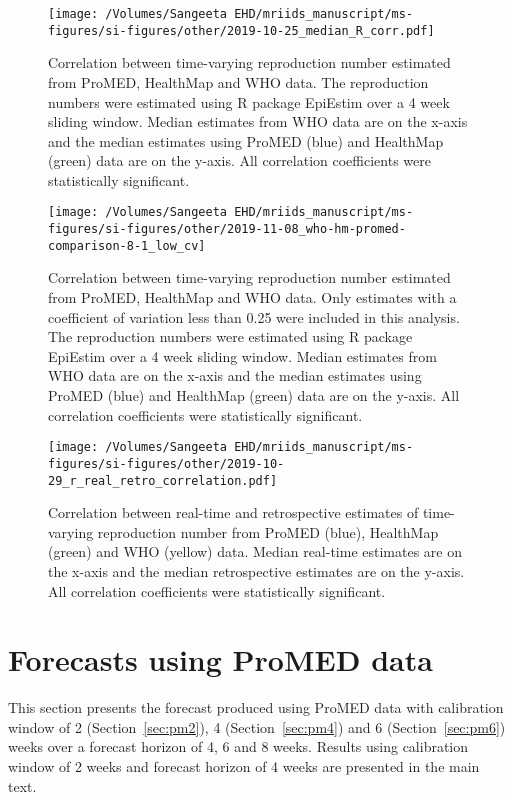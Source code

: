 \documentclass[9pt,twoside,lineno]{pnas-new}
\begin{document}
\begin{figure}
  \centering
  \texttt{[image: /Volumes/Sangeeta EHD/mriids\_manuscript/ms-figures/si-figures/other/2019-10-25\_median\_R\_corr.pdf]}
  \caption{Correlation between time-varying reproduction number estimated from
    ProMED, HealthMap and WHO data. The reproduction numbers were
    estimated using R package EpiEstim over a 4 week sliding
    window. Median estimates from WHO data are on the x-axis and the
    median estimates using ProMED (blue) and HealthMap (green) data
    are on the y-axis. All correlation coefficients were statistically
  significant.}
  \label{fig:rcorr}
\end{figure}\FloatBarrier

\begin{figure}
  \centering
  \texttt{[image: /Volumes/Sangeeta EHD/mriids\_manuscript/ms-figures/si-figures/other/2019-11-08\_who-hm-promed-comparison-8-1\_low\_cv]}
  \caption{Correlation between time-varying reproduction number estimated from
    ProMED, HealthMap and WHO data. Only estimates with a coefficient
    of variation less than 0.25 were included in this analysis. 
    The reproduction numbers were
    estimated using R package EpiEstim over a 4 week sliding
    window. Median estimates from WHO data are on the x-axis and the
    median estimates using ProMED (blue) and HealthMap (green) data
    are on the y-axis. All correlation coefficients were statistically
  significant.}
  \label{fig:lowcv}
\end{figure}\FloatBarrier

\begin{figure}
  \centering
  \texttt{[image: /Volumes/Sangeeta EHD/mriids\_manuscript/ms-figures/si-figures/other/2019-10-29\_r\_real\_retro\_correlation.pdf]}
  \caption{Correlation between real-time and retrospective estimates
    of time-varying reproduction number from
    ProMED (blue), HealthMap (green) and WHO (yellow) data. 
    Median real-time estimates are on the x-axis and the
    median retrospective estimates are on the y-axis. 
   All correlation coefficients were statistically significant.}
  \label{fig:rcorrrealretro}
\end{figure}\FloatBarrier

\section{Forecasts using ProMED data}\label{sec:pm} 

This section presents the forecast produced using ProMED data with
calibration window of 2 (Section~\ref{sec:pm2}), 
4 (Section~\ref{sec:pm4}) and 6 
(Section~\ref{sec:pm6}) weeks over a 
forecast horizon of 4, 6 and 8 weeks. Results using calibration window
of 2 weeks and forecast horizon of 4 weeks are presented in the main
text.
\end{document}

